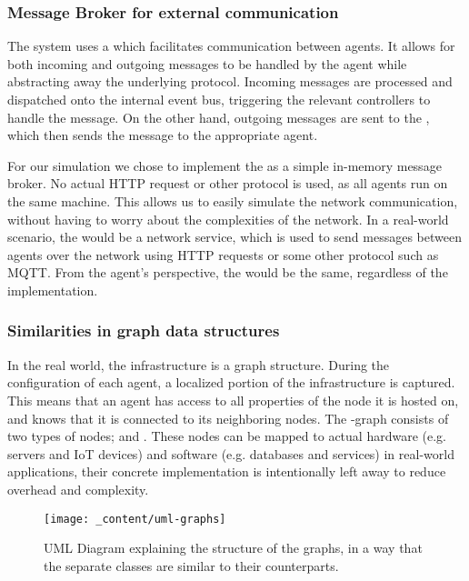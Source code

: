\subsubsection{Message Broker for external communication}
\label{sssec:message-broker}
The system uses a  which facilitates communication between agents. It allows for both incoming and outgoing messages to be handled by the agent while abstracting away the underlying protocol. Incoming messages are processed and dispatched onto the internal event bus, triggering the relevant controllers to handle the message. On the other hand, outgoing messages are sent to the , which then sends the message to the appropriate agent.

For our simulation we chose to implement the  as a simple in-memory message broker. No actual HTTP request or other protocol is used, as all agents run on the same machine. This allows us to easily simulate the network communication, without having to worry about the complexities of the network. In a real-world scenario, the  would be a network service, which is used to send messages between agents over the network using HTTP requests or some other protocol such as MQTT. From the agent's perspective, the  would be the same, regardless of the implementation.


\subsubsection{Similarities in graph data structures}
\label{sssec:graph-data-structures}
In the real world, the infrastructure is a graph structure. During the configuration of each agent, a localized portion of the infrastructure is captured. This means that an agent has access to all properties of the node it is hosted on, and knows that it is connected to its neighboring nodes. The -graph consists of two types of nodes;  and . These nodes can be mapped to actual hardware (e.g. servers and IoT devices) and software (e.g. databases and services) in real-world applications, their concrete implementation is intentionally left away to reduce overhead and complexity.

\begin{figure}[H]
    \centering
    \texttt{[image: \_content/uml-graphs]}
    \caption{UML Diagram explaining the structure of the graphs, in a way that the separate classes are similar to their counterparts.}
    \label{fig:uml-graphs}
\end{figure}

